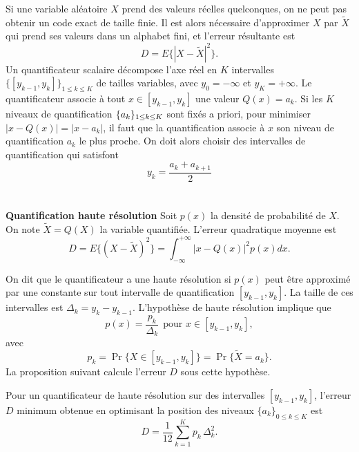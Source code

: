 Si une variable al\'eatoire $X$ 
prend des valeurs r\'eelles quelconques, on ne peut pas
obtenir un code exact de taille finie.
Il est alors n\'ecessaire d'approximer $X$ par 
$\tilde X$ qui prend ses valeurs dans un alphabet fini, et
l'erreur r\'esultante est
\[
D = E \{|X - \tilde X|^2\} .
\]
Un quantificateur scalaire d\'ecompose l'axe r\'eel en 
$K$ intervalles $\{[y_{k-1} , y_k ]\}_{1 \leq k \leq K}$ 
de tailles variables, avec $y_0 = -\infty$ et $y_K = +\infty$.
Le quantificateur associe \`a tout
$x \in [y_{k-1} , y_k]$ une valeur
$Q(x) =a_k$.
Si les $K$ niveaux de quantification $\{a_k\}_{{ 1 \leq k \leq K}}$
sont fix\'es a priori,
pour minimiser $|x - Q(x)| = |x - a_k|$, 
il faut que la quantification
associe \`a $x$ son niveau de quantification $a_k$ le plus
proche. On doit alors choisir des intervalles de quantification
qui satisfont
\begin{equation}
\label{opt-interv}
y_k = \frac {a_k + a_{k+1}} 2
\end{equation}
\\
\\
{\bf Quantification haute r\'esolution}
Soit $p(x)$ la densit\'e de probabilit\'e de $X$. 
On note $\tilde X = Q (X)$ la variable quantifi\'ee.
L'erreur quadratique moyenne est
\begin{equation}
\label{quantize-error}
D = E\{(X- \tilde X)^2\} = 
\int_{-\infty}^{+\infty} |x - Q(x)|^2 p(x) dx .
\end{equation}

On dit que le quantificateur a une haute 
r\'esolution si
$p(x)$ peut \^etre approxim\'e par une constante sur tout intervalle
de quantification $[{y_{k-1}},{y_{k}}]$. 
La taille de ces intervalles est $\Delta_k = y_k - y_{k-1}$.
L'hypoth\`ese de haute r\'esolution implique que
\begin{equation}
\label{high-resol-quant}
p(x) = \frac {p_k} {\Delta_k} ~~\mbox{pour $x \in [y_{k-1},{y_{k}}]$},
\end{equation}
avec
\[
p_k = \Pr \{X \in [{y_{k-1}},y_{k}] \} = \Pr \{ \tilde X = a_k \} .
\]
La proposition suivant calcule l'erreur $D$ sous cette hypoth\`ese.

\begin{proposition}
Pour un quantificateur de haute r\'esolution sur des intervalles
$[{y_{k-1}},{y_{k}}]$, l'erreur $D$
minimum obtenue en optimisant la position des niveaux 
$\{ a_k \}_{0 \leq k \leq K}$ est
\begin{equation}
\label{quadr-error}
D = \frac 1 {12} \sum_{k=1}^{K} {p_k} \, {\Delta_k ^2} .
\end{equation}
\end{proposition}

